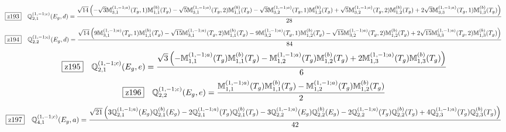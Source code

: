 \documentclass[fleqn,10pt,landscape]{jsarticle}
\begin{document}
\begin{dmath*}
\hspace*{3mm}\fbox{z193}\quad \mathbb{Q}_{2,1}^{(1,-1;c)}(E_{g},d)=\frac{\sqrt{14} \left(- \sqrt{3} \mathbb{M}_{3,1}^{(1,-1;a)}(T_{g},1) \mathbb{M}_{1,1}^{(b)}(T_{g}) - \sqrt{5} \mathbb{M}_{3,1}^{(1,-1;a)}(T_{g},2) \mathbb{M}_{1,1}^{(b)}(T_{g}) - \sqrt{3} \mathbb{M}_{3,2}^{(1,-1;a)}(T_{g},1) \mathbb{M}_{1,2}^{(b)}(T_{g}) + \sqrt{5} \mathbb{M}_{3,2}^{(1,-1;a)}(T_{g},2) \mathbb{M}_{1,2}^{(b)}(T_{g}) + 2 \sqrt{3} \mathbb{M}_{3,3}^{(1,-1;a)}(T_{g},1) \mathbb{M}_{1,3}^{(b)}(T_{g})\right)}{28}
\end{dmath*}
\begin{dmath*}
\hspace*{3mm}\fbox{z194}\quad \mathbb{Q}_{2,2}^{(1,-1;c)}(E_{g},d)=\frac{\sqrt{14} \left(9 \mathbb{M}_{3,1}^{(1,-1;a)}(T_{g},1) \mathbb{M}_{1,1}^{(b)}(T_{g}) - \sqrt{15} \mathbb{M}_{3,1}^{(1,-1;a)}(T_{g},2) \mathbb{M}_{1,1}^{(b)}(T_{g}) - 9 \mathbb{M}_{3,2}^{(1,-1;a)}(T_{g},1) \mathbb{M}_{1,2}^{(b)}(T_{g}) - \sqrt{15} \mathbb{M}_{3,2}^{(1,-1;a)}(T_{g},2) \mathbb{M}_{1,2}^{(b)}(T_{g}) + 2 \sqrt{15} \mathbb{M}_{3,3}^{(1,-1;a)}(T_{g},2) \mathbb{M}_{1,3}^{(b)}(T_{g})\right)}{84}
\end{dmath*}
\begin{dmath*}
\hspace*{3mm}\fbox{z195}\quad \mathbb{Q}_{2,1}^{(1,-1;c)}(E_{g},e)=\frac{\sqrt{3} \left(- \mathbb{M}_{1,1}^{(1,-1;a)}(T_{g}) \mathbb{M}_{1,1}^{(b)}(T_{g}) - \mathbb{M}_{1,2}^{(1,-1;a)}(T_{g}) \mathbb{M}_{1,2}^{(b)}(T_{g}) + 2 \mathbb{M}_{1,3}^{(1,-1;a)}(T_{g}) \mathbb{M}_{1,3}^{(b)}(T_{g})\right)}{6}
\end{dmath*}
\begin{dmath*}
\hspace*{3mm}\fbox{z196}\quad \mathbb{Q}_{2,2}^{(1,-1;c)}(E_{g},e)=\frac{\mathbb{M}_{1,1}^{(1,-1;a)}(T_{g}) \mathbb{M}_{1,1}^{(b)}(T_{g}) - \mathbb{M}_{1,2}^{(1,-1;a)}(T_{g}) \mathbb{M}_{1,2}^{(b)}(T_{g})}{2}
\end{dmath*}
\begin{dmath*}
\hspace*{3mm}\fbox{z197}\quad \mathbb{Q}_{4,1}^{(1,-1;c)}(E_{g},a)=\frac{\sqrt{21} \left(3 \mathbb{Q}_{2,1}^{(1,-1;a)}(E_{g}) \mathbb{Q}_{2,1}^{(b)}(E_{g}) - 2 \mathbb{Q}_{2,1}^{(1,-1;a)}(T_{g}) \mathbb{Q}_{2,1}^{(b)}(T_{g}) - 3 \mathbb{Q}_{2,2}^{(1,-1;a)}(E_{g}) \mathbb{Q}_{2,2}^{(b)}(E_{g}) - 2 \mathbb{Q}_{2,2}^{(1,-1;a)}(T_{g}) \mathbb{Q}_{2,2}^{(b)}(T_{g}) + 4 \mathbb{Q}_{2,3}^{(1,-1;a)}(T_{g}) \mathbb{Q}_{2,3}^{(b)}(T_{g})\right)}{42}
\end{dmath*}
\end{document}
